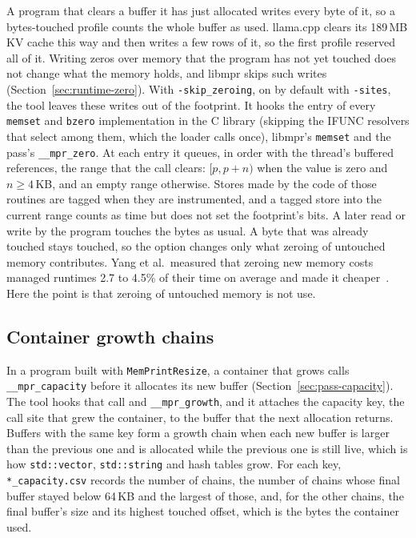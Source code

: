 \documentclass[11pt]{article}
\newcommand{\pass}{\texttt{MemPrintResize}}
\newcommand{\secref}[1]{Section~\ref{#1}}
\begin{document}
A program that clears a buffer it has just allocated writes every byte of it, so a bytes-touched profile counts
the whole buffer as used. llama.cpp clears its 189\,MB KV cache this way and then writes a few rows of it, so the
first profile reserved all of it. Writing zeros over memory that the program has not yet touched does not change
what the memory holds, and libmpr skips such writes (\secref{sec:runtime-zero}). With \texttt{-skip\_zeroing}, on by
default with \texttt{-sites}, the tool leaves these writes out of the footprint. It hooks the entry of every
\texttt{memset} and \texttt{bzero} implementation in the C library (skipping the IFUNC resolvers that select
among them, which the loader calls once), libmpr's \texttt{memset} and the pass's \texttt{\_\_mpr\_zero}. At each
entry it queues, in order with the thread's buffered references, the range that the call clears: $[p, p+n)$ when
the value is zero and $n \geq 4$\,KB, and an empty range otherwise. Stores made by the code of those routines are
tagged when they are instrumented, and a tagged store into the current range counts as time but does not set the
footprint's bits. A later read or write by the program touches the bytes as usual. A byte that was already
touched stays touched, so the option changes only what zeroing of untouched memory contributes. Yang et al.\
measured that zeroing new memory costs managed runtimes 2.7 to 4.5\% of their time on average and made it
cheaper~\cite{Yang2011Zeroing}. Here the point is that zeroing of untouched memory is not use.

\subsection{Container growth chains}
\label{sec:profile-capacity}

In a program built with \pass{}, a container that grows calls \texttt{\_\_mpr\_capacity} before it allocates its
new buffer (\secref{sec:pass-capacity}). The tool hooks that call and \texttt{\_\_mpr\_growth}, and it attaches the
capacity key, the call site that grew the container, to the buffer that the next allocation returns. Buffers with
the same key form a growth chain when each new buffer is larger than the previous one and is allocated while the
previous one is still live, which is how \texttt{std::vector}, \texttt{std::string} and hash tables grow. For each
key, \texttt{*\_capacity.csv} records the number of chains, the number of chains whose final buffer stayed below
64\,KB and the largest of those, and, for the other chains, the final buffer's size and its highest touched
offset, which is the bytes the container used.
\end{document}
